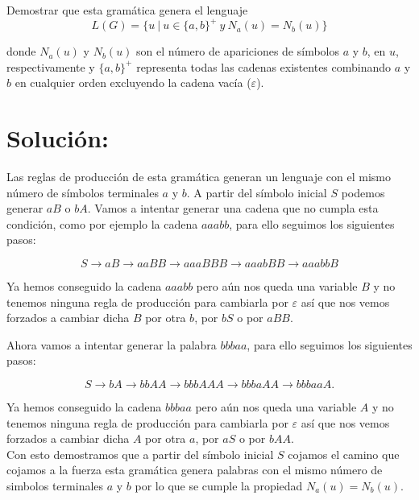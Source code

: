 \documentclass[10pt,a4paper,spanish]{report}
\begin{document}
\noindent
Demostrar que esta gramática genera el lenguaje
\begin{displaymath}
	L(G) = \{u~ | ~u \in \{a,b\}^+ ~y~ N_a(u) = N_b(u) \}
\end{displaymath}

\noindent
donde $N_a(u)$ y $N_b(u)$ son el número de apariciones de símbolos $a$ y $b$, en $u$, respectivamente y $\{a,b\}^+$ representa todas las cadenas existentes combinando $a$ y $b$ en cualquier orden excluyendo la cadena vacía ($\varepsilon$).

\section{Solución:}

\noindent
Las reglas de producción de esta gramática generan un lenguaje con el mismo número de símbolos terminales $a$ y $b$. A partir del símbolo inicial $S$ podemos generar $aB$ o $bA$. Vamos a intentar generar una cadena que no cumpla esta condición, como por ejemplo la cadena $aaabb$, para ello seguimos los siguientes pasos:

\begin{displaymath}
	S \rightarrow aB \rightarrow aaBB \rightarrow aaaBBB \rightarrow aaabBB \rightarrow aaabbB
\end{displaymath}

\noindent
Ya hemos conseguido la cadena $aaabb$ pero aún nos queda una variable $B$ y no tenemos ninguna regla de producción para cambiarla por $\varepsilon$ así que nos vemos forzados a cambiar dicha $B$ por otra $b$, por $bS$ o por $aBB$.

\noindent
Ahora vamos a intentar generar la palabra $bbbaa$, para ello seguimos los siguientes pasos:

\begin{displaymath}
	S \rightarrow bA \rightarrow bbAA \rightarrow bbbAAA \rightarrow bbbaAA \rightarrow bbbaaA.
\end{displaymath}

\noindent
Ya hemos conseguido la cadena $bbbaa$ pero aún nos queda una variable $A$ y no tenemos ninguna regla de producción para cambiarla por $\varepsilon$ así que nos vemos forzados a cambiar dicha $A$ por otra $a$, por $aS$ o por $bAA$. \\

\noindent
Con esto demostramos que a partir del símbolo inicial $S$ cojamos el camino que cojamos a la fuerza esta gramática genera palabras con el mismo número de simbolos terminales $a$ y $b$ por lo que se cumple la propiedad $N_a(u) = N_b(u)$.
\end{document}
